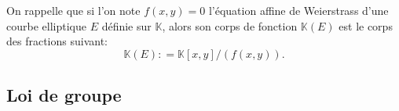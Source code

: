\documentclass[10pt,a4paper]{book}
\theoremstyle{plain}
\theoremstyle{definition}
\theoremstyle{definition}
\theoremstyle{definition}
\theoremstyle{definition}
\theoremstyle{remark}
\theoremstyle{remark}
\newcommand{\defeq}{\mathrel{\mathop:}=}
\begin{document}
On rappelle que si l'on note $f(x,y)=0$ l'équation affine de Weierstrass d'une courbe elliptique $E$ définie sur $\mathbb{K}$, alors son corps de fonction $\mathbb{K}(E)$ est le corps des fractions suivant:
\begin{equation*}
\mathbb{K}(E) \defeq \mathbb{K}[x,y]/(f(x,y)).
\end{equation*}

\subsection{Loi de groupe}
%
\end{document}
